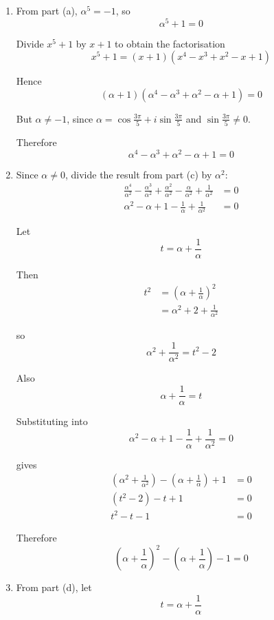 \documentclass[leqno]{article}
\begin{document}
\begin{enumerate}[
  label=\textbf{\arabic*.},
  leftmargin=*,
  topsep=0pt,
  partopsep=0pt,
  parsep=0pt
]
\begin{djsSolution}
\begin{enumerate}[label=\textbf{(\alph*)}]
Given that $\alpha=\cos\frac{3\pi}{5}+i\sin\frac{3\pi}{5}$, the other four roots are
\[
\cos\frac{\pi}{5}+i\sin\frac{\pi}{5},\quad
\cos\pi+i\sin\pi,\quad
\cos\frac{7\pi}{5}+i\sin\frac{7\pi}{5},\quad
\cos\frac{9\pi}{5}+i\sin\frac{9\pi}{5}
\]

  \item From part (a), $\alpha^5=-1$, so
\[
\alpha^5+1=0
\]

Divide $x^5+1$ by $x+1$ to obtain the factorisation
\[
x^5+1=(x+1)(x^4-x^3+x^2-x+1)
\]

Hence
\[
(\alpha+1)(\alpha^4-\alpha^3+\alpha^2-\alpha+1)=0
\]

But $\alpha\ne -1$, since $\alpha=\cos\frac{3\pi}{5}+i\sin\frac{3\pi}{5}$ and $\sin\frac{3\pi}{5}\ne 0$.

Therefore
\[
\alpha^4-\alpha^3+\alpha^2-\alpha+1=0
\]

  \item Since $\alpha\neq 0$, divide the result from part (c) by $\alpha^2$:
\begin{align*}
\frac{\alpha^4}{\alpha^2}-\frac{\alpha^3}{\alpha^2}+\frac{\alpha^2}{\alpha^2}-\frac{\alpha}{\alpha^2}+\frac{1}{\alpha^2}&=0 \\
\alpha^2-\alpha+1-\frac{1}{\alpha}+\frac{1}{\alpha^2}&=0
\end{align*}

Let
\[
t=\alpha+\frac{1}{\alpha}
\]

Then
\begin{align*}
t^2
&=\left(\alpha+\frac{1}{\alpha}\right)^2 \\
&=\alpha^2+2+\frac{1}{\alpha^2}
\end{align*}

so
\[
\alpha^2+\frac{1}{\alpha^2}=t^2-2
\]

Also
\[
\alpha+\frac{1}{\alpha}=t
\]

Substituting into
\[
\alpha^2-\alpha+1-\frac{1}{\alpha}+\frac{1}{\alpha^2}=0
\]

gives
\begin{align*}
\left(\alpha^2+\frac{1}{\alpha^2}\right)-\left(\alpha+\frac{1}{\alpha}\right)+1&=0 \\
(t^2-2)-t+1&=0 \\
t^2-t-1&=0
\end{align*}

Therefore
\[
\left(\alpha+\frac{1}{\alpha}\right)^2-\left(\alpha+\frac{1}{\alpha}\right)-1=0
\]

  \item From part (d), let
\[
t=\alpha+\frac{1}{\alpha}
\]


\end{enumerate}
\end{djsSolution}
\end{enumerate}
\end{document}
